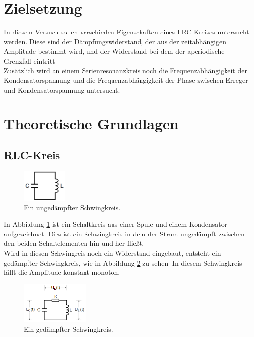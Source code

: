 \section{Zielsetzung}
    \noindent In diesem Versuch sollen verschieden Eigenschaften eines LRC-Kreises untersucht werden. Diese sind der Dämpfungswiderstand, der aus der 
    zeitabhängigen Amplitude bestimmt wird, und der Widerstand bei dem der aperiodische Grenzfall eintritt. \\
    Zusätzlich wird an einem
    Serienresonanzkreis noch die Frequenzabhängigkeit der Kondensatorspannung und die Frequenzabhängigkeit der Phase zwischen Erreger- und 
    Kondensatorspannung untersucht.
   

\section{Theoretische Grundlagen}


    \subsection{RLC-Kreis}


    \begin{figure}[H]
        \centering
        \includegraphics[width=0.2\textwidth]{images/unged.PNG}
        \caption{Ein ungedämpfter Schwingkreis\protect \cite{V354}.}
        \label{img:unged}
    \end{figure}

    \noindent In Abbildung \ref{img:unged} ist ein Schaltkreis aus einer Spule und einem Kondensator aufgezeichnet. Dies ist ein Schwingkreis 
    in dem der Strom ungedämpft zwischen den beiden Schaltelementen hin und her fließt.\\
    Wird in diesen Schwingreis noch ein Widerstand eingebaut, 
    entsteht ein gedämpfter Schwingkreis, wie in Abbildung \ref{img:gedKr} zu sehen. 
    In diesem Schwingkreis fällt die Amplitude konstant monoton.
    
    \begin{figure}[H]
        \centering
        \includegraphics[width=0.3\textwidth]{images/gedKr.PNG}
        \caption{Ein gedämpfter Schwingkreis\protect \cite{V354}.}
        \label{img:gedKr}
    \end{figure}
    
